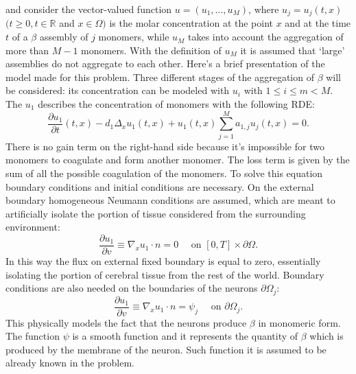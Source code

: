 \noindent and consider the vector-valued function $u=(u_1,\dots, u_M)$, where $u_j=u_j(t,x)$ $(t\geq 0, t\in \mathbb{R}$ and $x\in \Omega)$ is the molar concentration at the point $x$ and at the time $t$ of a \(\beta\) assembly of $j$ monomers, while $u_M$ takes into account the aggregation of more than $M-1$ monomers. With the definition of $u_M$ it is assumed that `large' assemblies do not aggregate to each other.
Here's a brief presentation of the model made for this problem. Three different stages of the aggregation of \(\beta\) will be considered: its concentration can be modeled with $u_{i}$ with $1\leq i \leq m < M$.
The $u_{1}$ describes the concentration of monomers with the following RDE: 
$$
\frac{\partial u_{1}}{\partial t}(t, x)-d_{1} \Delta_{x} u_{1}(t, x)+u_{1}(t, x) \sum_{j=1}^{M} a_{1, j} u_{j}(t, x)=0.
$$
There is no gain term on the right-hand side because it's impossible for two monomers to coagulate and form another monomer. The loss term is given by the sum of all the possible coagulation of the monomers. 
To solve this equation boundary conditions and initial conditions are necessary.
On the external boundary homogeneous Neumann conditions are assumed, which are meant to artificially isolate the portion of tissue considered from the surrounding environment:
$$
\frac{\partial u_1}{\partial v} \equiv \nabla_{x} u_1\cdot n=0 \quad \text { on }[0, T] \times \partial \Omega.$$
In this way the flux on external fixed boundary is equal to zero, essentially isolating the portion of cerebral tissue from the rest of the world.
Boundary conditions are also needed on the boundaries of the neurons $\partial\Omega_{j}$:
$$ 
\frac{\partial u_{1}}{\partial v} \equiv \nabla_{x} u_1 \cdot n= \psi_{j} \quad \text { on } \partial\Omega_{j}.
$$
This physically models the fact that the neurons produce \(\beta\) in monomeric form. The function $\psi$ is a smooth function and it represents the quantity of \(\beta\) which is produced by the membrane of the neuron. Such function it is assumed to be already known in the problem.


